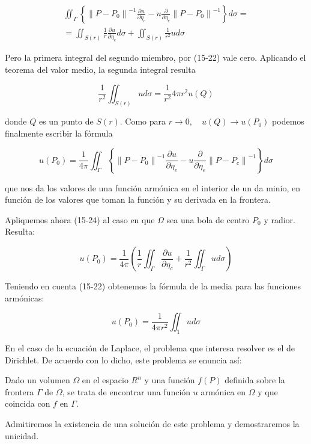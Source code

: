 \documentclass[10pt]{article}
\theoremstyle{plain}
\theoremstyle{definition}
\theoremstyle{remark}
\begin{document}
$$
\begin{gathered}
\iint_{\Gamma}\left\{\left\|P-P_{0}\right\|^{-1} \frac{\partial u}{\partial \eta_{c}}-u \frac{\partial}{\partial \eta_{e}}\left\|P-P_{0}\right\|^{-1}\right\} d \sigma= \\
=\iint_{S(r)} \frac{1}{r} \frac{\partial u}{\partial \eta_{e}} d \sigma+\iint_{S(r)} \frac{1}{r^{2}} u d \sigma
\end{gathered}
$$

Pero la primera integral del segundo miembro, por (15-22) vale cero. Aplicando el teorema del valor medio, la segunda integral resulta

$$
\frac{1}{r^{2}} \iint_{S(r)} u d \sigma=\frac{1}{r^{2}} 4 \pi r^{2} u(Q)
$$

donde $Q$ es un punto de $S(r)$. Como para $r \rightarrow 0, \quad u(Q) \rightarrow u\left(P_{0}\right)$ podemos finalmente escribir la fórmula


\begin{equation*}
u\left(P_{0}\right)=\frac{1}{4 \pi} \iint_{\Gamma}\left\{\left\|P-P_{0}\right\|^{-1} \frac{\partial u}{\partial \eta_{e}}-u \frac{\partial}{\partial \eta_{e}}\left\|P-P_{c}\right\|^{-1}\right\} d \sigma \tag{$15\cdot-24$}
\end{equation*}


que nos da los valores de una función armónica en el interior de un da minio, en función de los valores que toman la función y su derivada en la frontera.

Apliquemos ahora (15-24) al caso en que $\Omega$ sea una bola de centro $P_{0}$ y radior. Resulta:

$$
u\left(P_{0}\right)=\frac{1}{4 \pi}\left(\frac{1}{r} \iint_{\Gamma} \frac{\partial u}{\partial \eta_{c}}+\frac{1}{r^{2}} \iint_{\Gamma} u d \sigma\right)
$$

Teniendo en cuenta (15-22) obtenemos la fórmula de la media para las funciones armónicas:

$$
u\left(P_{0}\right)=\frac{1}{4 \pi r^{2}} \iint_{1} u d \sigma
$$

En el caso de la ecuación de Laplace, el problema que interesa resolver es el de Dirichlet. De acuerdo con lo dicho, este problema se enuncia así:

Dado un volumen $\Omega$ en el espacio $R^{n}$ y una función $f(P)$ definida sobre la frontera $\Gamma$ de $\Omega$, se trata de encontrar una función $u$ armónica en $\Omega$ y que coincida con $f$ en $\Gamma$.

Admitiremos la existencia de una solución de este problema y demostraremos la unicidad.
\end{document}
